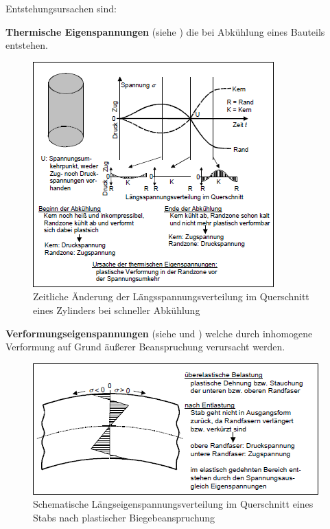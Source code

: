 \documentclass[12pt,a4paper,parskip,twoside,BCOR5mm,headsepline]{scrartcl}
\begin{document}
\begin{description*}
{Entstehungsursachen sind:
\begin{itemize*}
\item \textbf{Thermische Eigenspannungen} (siehe ) die bei Abkühlung eines Bauteils entstehen.\begin{figure}
  \centering
  \includegraphics[width=.8\textwidth] {eigenspanabk}
  \caption[Spannungsverteilung eines Zylinders]{Zeitliche Änderung der Längsspannungsverteilung im Querschnitt eines Zylinders bei schneller Abkühlung\autocite[34]{hu}}
  \label{fig:eigenspanabk}
  \end{figure}
  

\item \textbf{Verformungseigenspannungen} (siehe  und ) welche durch inhomogene Verformung auf Grund äußerer Beanspruchung verursacht werden.\begin{figure}
  \centering
  \includegraphics[width=.8\textwidth]{eigenspanfaser}
  \caption[Längseigenspannungsverteilung eines Stabquerschnittes]{Schematische Längseigenspannungsverteilung im Querschnitt eines Stabs nach plastischer Biegebeanspruchung\autocite[34]{hu}}
  \label{fig:eigenspanfaser}
  \end{figure}


\end{itemize*}}
\end{description*}
\end{document}
